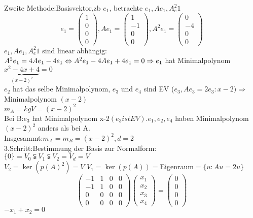 \documentclass[a4paper, 10pt]{scrbook}
\begin{document}
\begin{ex}
Zweite Methode:Basisvektor,zb $e_1$, betrachte $e_1,Ae_1,A^2_e1$\\
\[e_1=\begin{pmatrix}1\\0\\0\\0\end{pmatrix},Ae_1=\begin{pmatrix}1\\-1\\0\\0\end{pmatrix}, A^2e_1=\begin{pmatrix}0\\-4\\0\\0\end{pmatrix}\]
$e_1,Ae_1,A^2_e1$ sind linear abhängig:$A^2e_1=4Ae_1-4e_1\Leftrightarrow A^2e_1-4Ae_1+4e_1=0\\
\Rightarrow e_1$ hat Minimalpolynom $\underbrace{x^2-4x+4}_{(x-2)^2}=0$\\
$e_2$ hat das selbe Minimalpolynom, $e_3$ und $e_4$ sind EV ($e_3, Ae_3=2e_3 : x-2)\Rightarrow$ Minimalpolynom $(x-2)$\\
$m_A=kgV=(x-2)^2$
\\
Bei B:$e_3$ hat Minimalpolynom x-2$(e_3 ist EV). e_1,e_2,e_4$ haben Minimalpolynom $(x-2)^2$ anders als bei A.\\
Insgesammt:$m_A=m_B=(x-2)^2,d=2$\\
3.Schritt:Bestimmung der Basis zur Normalform:\\
$\{ 0\}=V_0\subsetneqq V_1\subsetneqq V_2=V_d=V$\\ $V_2=\ker(p(A)^2)=V$ $V_1=\ker(p(A))=$Eigenraum$=\{u:Au=2u\}$
\[\begin{pmatrix}-1&1&0&0\\-1&1&0&0\\0&0&0&0\\0&0&0&0\end{pmatrix} \begin{pmatrix}x_1\\x_2\\x_3\\x_4\end{pmatrix}=\begin{pmatrix}0\\0\\0\\0\end{pmatrix}
\]
$-x_1+x_2=0$\\

\end{ex}
\end{document}

